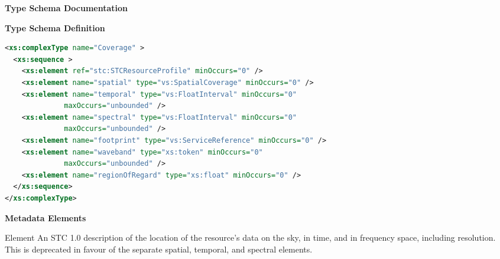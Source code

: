 \documentclass[11pt,a4paper]{ivoa}
\begin{document}
\begin{generated}
\begingroup
        \renewcommand*\descriptionlabel[1]{%
        \hbox to 5.5em{\emph{#1}\hfil}}\vspace{2ex}\noindent\textbf{ Type Schema Documentation}


\vspace{1ex}\noindent\textbf{ Type Schema Definition}

\begin{lstlisting}[language=XML,basicstyle=\footnotesize]
<xs:complexType name="Coverage" >
  <xs:sequence >
    <xs:element ref="stc:STCResourceProfile" minOccurs="0" />
    <xs:element name="spatial" type="vs:SpatialCoverage" minOccurs="0" />
    <xs:element name="temporal" type="vs:FloatInterval" minOccurs="0"
              maxOccurs="unbounded" />
    <xs:element name="spectral" type="vs:FloatInterval" minOccurs="0"
              maxOccurs="unbounded" />
    <xs:element name="footprint" type="vs:ServiceReference" minOccurs="0" />
    <xs:element name="waveband" type="xs:token" minOccurs="0"
              maxOccurs="unbounded" />
    <xs:element name="regionOfRegard" type="xs:float" minOccurs="0" />
  </xs:sequence>
</xs:complexType>
\end{lstlisting}

\vspace{0.5ex}\noindent\textbf{ Metadata Elements}

\begingroup\small\begin{bigdescription}\item[Element \xmlel{stc:STCResourceProfile}]
An STC 1.0 description of the location of the resource's
                 data on the sky, in time, and in frequency space,
                 including resolution.   This is deprecated in favour
                 of the separate spatial, temporal, and spectral elements.


\end{bigdescription}
\end{generated}
\end{document}
